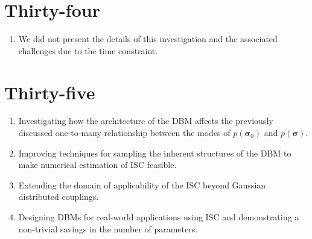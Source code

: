 \documentclass{article}
\begin{document}
\section*{Thirty-four}
\begin{enumerate}
    \item We did not present the details of this investigation and the associated challenges due to the time constraint.
\end{enumerate}

\section*{Thirty-five}
\begin{enumerate}
    \item Investigating how the architecture of the DBM affects the previously discussed one-to-many relationship between the modes of \(p(\boldsymbol{\sigma}_{0})\) and \(p(\boldsymbol{\sigma})\).
    \item Improving techniques for sampling the inherent structures of the DBM to make numerical estimation of \(\mathrm{ISC}\) feasible.
    \item Extending the domain of applicability of the \(\mathrm{ISC}\) beyond Gaussian distributed couplings.
    \item Designing DBMs for real-world applications using \(\mathrm{ISC}\) and demonstrating a non-trivial savings in the number of parameters.
\end{enumerate}
\end{document}
